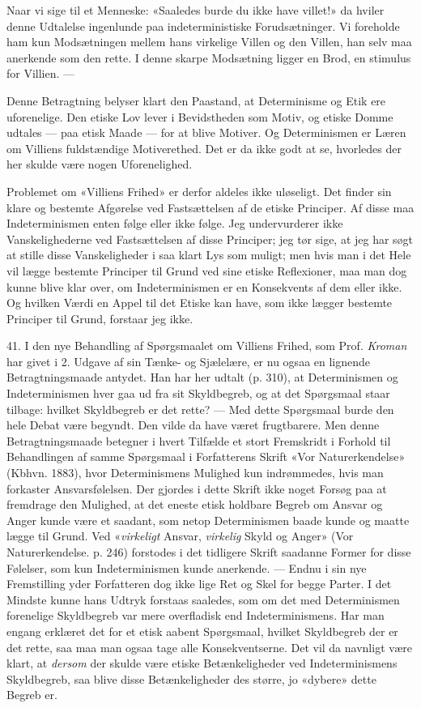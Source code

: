 \documentclass[12pt,a4paper,openany]{book}
\newcommand{\opage}[1]{\marginnote{\footnotesize\textit{[#1]}}}
\begin{document}
Naar vi sige til et Menneske: «Saaledes burde du ikke have villet!» da hviler
denne Udtalelse ingenlunde paa indeterministiske Forudsætninger. Vi foreholde
ham kun Modsætningen mellem hans virkelige Villen og den Villen, han selv maa
anerkende som den rette. I denne skarpe Modsætning ligger en Brod, en stimulus
for Villien. ---

Denne Betragtning belyser klart den Paastand, at Determinisme og Etik ere
uforenelige. Den etiske Lov lever i Bevidstheden som Motiv, og etiske Domme
udtales --- paa etisk Maade --- for at blive Motiver. Og Determinismen er Læren
om Villiens fuldstændige Motiverethed. Det er da ikke godt at se, hvorledes der
her skulde være nogen Uforenelighed.

Problemet om «Villiens Frihed» er derfor aldeles ikke uløseligt. Det finder sin
klare og bestemte Afgørelse ved Fastsættelsen af de etiske Principer. Af disse
maa Indeterminismen enten følge eller ikke følge. Jeg undervurderer ikke
Vanskelighederne ved Fastsættelsen af disse Principer; jeg tør sige, at jeg har
søgt at stille disse Vanskeligheder i saa klart Lys som muligt; men hvis man i
det Hele vil lægge bestemte Principer til Grund ved sine etiske Reflexioner,
maa man dog kunne blive klar over, om Indeterminismen
\setcounter{footnote}{0}%
\opage{99}er en Konsekvents af dem eller ikke. Og hvilken Værdi en Appel til
det Etiske kan have, som ikke lægger bestemte Principer til Grund, forstaar jeg ikke.

41. I den nye Behandling af Spørgsmaalet om Villiens Frihed, som Prof.
\emph{Kroman} har givet i 2. Udgave af sin Tænke- og Sjælelære, er nu ogsaa en
lignende Betragtningsmaade antydet. Han har her udtalt (p. 310), at
Determinismen og Indeterminismen hver gaa ud fra sit Skyldbegreb, og at det
Spørgsmaal staar tilbage: hvilket Skyldbegreb er det rette? --- Med dette
Spørgsmaal burde den hele Debat være begyndt. Den vilde da have været
frugtbarere. Men denne Betragtningsmaade betegner i hvert Tilfælde et stort
Fremskridt i Forhold til Behandlingen af samme Spørgsmaal i Forfatterens Skrift
«Vor Naturerkendelse» (Kbhvn. 1883), hvor Determinismens Mulighed kun
indrømmedes, hvis man forkaster Ansvarsfølelsen. Der gjordes i dette Skrift
ikke noget Forsøg paa at fremdrage den Mulighed, at det eneste etisk holdbare
Begreb om Ansvar og Anger kunde være et saadant, som netop Determinismen baade
kunde og maatte lægge til Grund. Ved «\emph{virkeligt} Ansvar, \emph{virkelig}
Skyld og Anger» (Vor Naturerkendelse. p. 246) forstodes i det tidligere Skrift
saadanne Former for disse Følelser, som kun Indeterminismen kunde anerkende.
--- Endnu i sin nye Fremstilling yder Forfatteren dog ikke lige Ret og Skel for
begge Parter. I det Mindste kunne hans Udtryk forstaas saaledes, som om det med
Determinismen forenelige Skyldbegreb var mere overfladisk end Indeterminismens.
Har man engang erklæret det for et etisk aabent Spørgsmaal, hvilket Skyldbegreb
der er det rette, saa maa man ogsaa tage alle Konsekventserne. Det vil da
navnligt være klart, at \emph{dersom} der skulde være etiske Betænkeligheder
ved Indeterminismens Skyldbegreb, saa blive disse Betænkeligheder des større,
jo «dybere» dette Begreb er.
\end{document}
